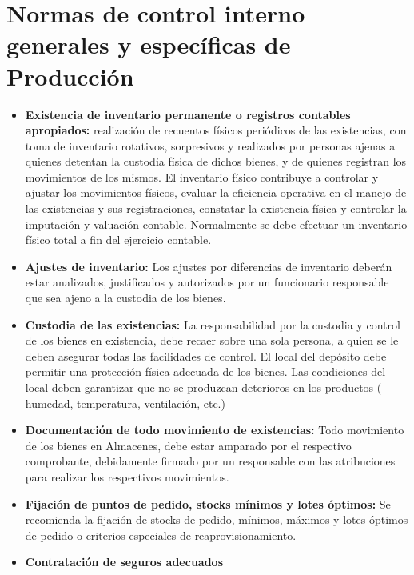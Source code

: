 \section{Normas de control interno generales y específicas de Producci\'on}
\begin{itemize}
  \item \textbf{Existencia de inventario permanente o registros contables apropiados:} realización de recuentos físicos periódicos de las existencias, con toma de inventario rotativos, sorpresivos y realizados por personas ajenas a quienes detentan la custodia física de dichos bienes, y de quienes registran los movimientos de los mismos. El inventario físico contribuye a controlar y ajustar los movimientos físicos, evaluar la eficiencia operativa en el manejo de las existencias y sus registraciones, constatar la existencia física y controlar la imputación y valuación contable. Normalmente se debe efectuar un inventario físico total a fin del ejercicio contable.
  \item \textbf{Ajustes de inventario:} Los ajustes por diferencias de inventario deberán estar analizados, justificados y autorizados por un funcionario responsable que sea ajeno a la custodia de los bienes.
  \item \textbf{Custodia de las existencias:} La responsabilidad por la custodia y control de los bienes en existencia, debe recaer sobre una sola persona, a quien se le deben asegurar todas las facilidades de control. El local del depósito debe permitir una protección física adecuada de los bienes.
  Las condiciones del local deben garantizar que no se produzcan deterioros en los productos ( humedad, temperatura, ventilación, etc.)
  \item \textbf{Documentación de todo movimiento de existencias:} Todo movimiento de los bienes en Almacenes, debe estar amparado por el respectivo comprobante, debidamente firmado por un responsable con las atribuciones para realizar los respectivos movimientos.
  \item \textbf{Fijación de puntos de pedido, stocks mínimos y lotes óptimos:} Se recomienda la fijación de stocks de pedido, mínimos, máximos y lotes óptimos de pedido o criterios especiales de reaprovisionamiento.
  \item \textbf{Contratación de seguros adecuados}
\end{itemize}

